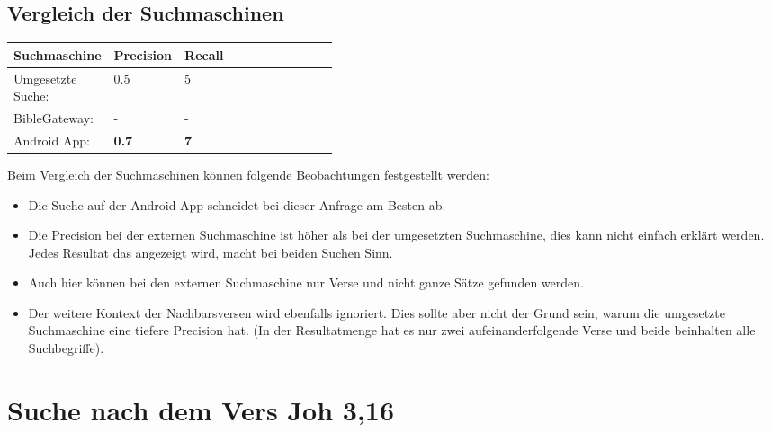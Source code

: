 \subsection{Vergleich der Suchmaschinen}
\begin{table}[H]
	\centering
	\small\renewcommand{\arraystretch}{1.4}
	\begin{tabularx}{0.9\textwidth}{ L{0.22\linewidth} | L{0.2\linewidth} | X }%
		\hline
		\textbf{Suchmaschine} & \textbf{Precision} & \textbf{Recall} \\ \hline \hline
		Umgesetzte Suche: & 0.5 & 5\\
		BibleGateway: & - & -\\
		Android App: & \textbf{0.7} & \textbf{7}\\
		\hline
	\end{tabularx}
\end{table}

Beim Vergleich der Suchmaschinen können folgende Beobachtungen festgestellt werden:
\begin{itemize}[noitemsep]
	\item Die Suche auf der Android App schneidet bei dieser Anfrage am Besten ab.
	
	\item Die Precision bei der externen Suchmaschine ist höher als bei der umgesetzten Suchmaschine, dies kann nicht einfach erklärt werden. Jedes Resultat das angezeigt wird, macht bei beiden Suchen Sinn.
	
	\item Auch hier können bei den externen Suchmaschine nur Verse und nicht ganze Sätze gefunden werden.
	
	\item Der weitere Kontext der Nachbarsversen wird ebenfalls ignoriert.
	Dies sollte aber nicht der Grund sein, warum die umgesetzte Suchmaschine eine tiefere Precision hat. (In der Resultatmenge hat es nur zwei aufeinanderfolgende Verse und beide beinhalten alle Suchbegriffe).
\end{itemize}



\newpage
\section{Suche nach dem Vers Joh 3,16}

